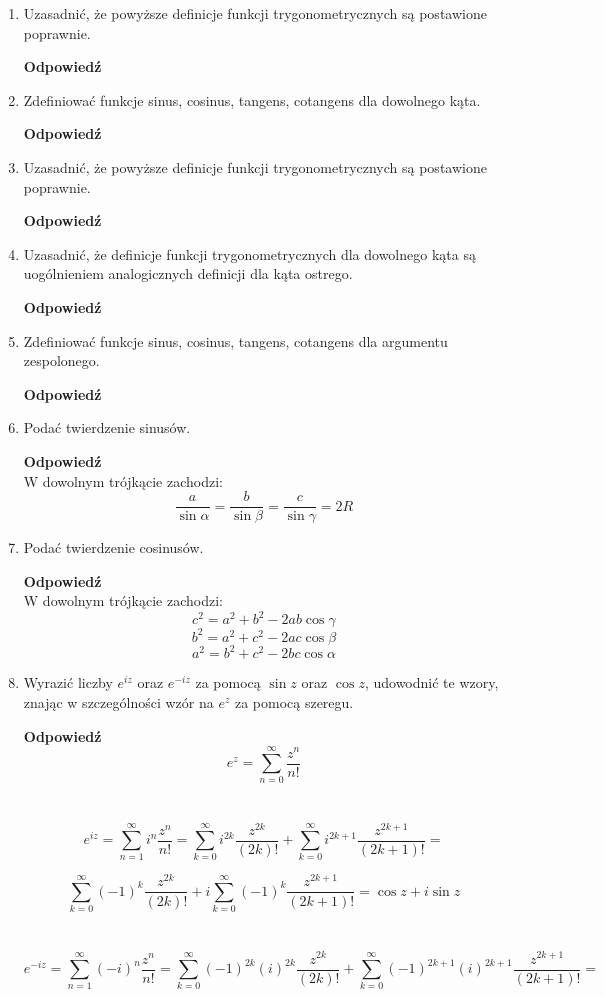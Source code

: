 \documentclass[12pt,a4paper]{article}
\newcounter{twierdzenie}
\theoremstyle{break}
\newcommand{\Odp}[1]{
		\begin{mdframed}[style=zadanie]
			\textbf{Odpowiedź}\\
			#1
		\end{mdframed}
	}
\begin{document}
\begin{enumerate}[1.]
	\item Uzasadnić, że powyższe deﬁnicje funkcji trygonometrycznych są postawione poprawnie.
	\Odp{
		
	}
	
	\item Zdeﬁniować funkcje sinus, cosinus, tangens, cotangens dla dowolnego kąta.
	\Odp{
		
	}
	
	\item Uzasadnić, że powyższe deﬁnicje funkcji trygonometrycznych są postawione poprawnie.
	\Odp{
		
	}
	
	\item Uzasadnić, że deﬁnicje funkcji trygonometrycznych dla dowolnego kąta są uogólnieniem analogicznych deﬁnicji dla kąta ostrego.
	\Odp{
		
	}
	
	\item Zdeﬁniować funkcje sinus, cosinus, tangens, cotangens dla argumentu zespolonego.
	\Odp{
		
	}
	
	\item Podać twierdzenie sinusów.
	\Odp{
		W dowolnym trójkącie zachodzi:
		$$\frac{a}{\sin\alpha}=\frac{b}{\sin\beta}=\frac{c}{\sin\gamma}=2R$$
	}
	
	\item Podać twierdzenie cosinusów.
	\Odp{
		W dowolnym trójkącie zachodzi:
		$$c^2=a^2+b^2-2ab\cos\gamma$$
		$$b^2=a^2+c^2-2ac\cos\beta$$
		$$a^2=b^2+c^2-2bc\cos\alpha$$
	}
	
	\item Wyrazić liczby $e^{iz}$ oraz $e^{-iz}$ za pomocą $\sin z$ oraz $\cos z$, udowodnić te wzory, znając w	szczególności wzór na $e^z$ za pomocą szeregu.
	\Odp{
		$$e^z=\sum_{n=0}^{\infty} \frac{z^n}{n!}$$\\\\
		
		$$e^{iz}=\sum_{n=1}^{\infty} i^n\frac{z^n}{n!}=
		\sum_{k=0}^{\infty}i^{2k}\frac{z^{2k}}{(2k)!}+\sum_{k=0}^{\infty}i^{2k+1}\frac{z^{2k+1}}{(2k+1)!}=$$
		
		 $$
		\sum_{k=0}^{\infty}(-1)^{k}\frac{z^{2k}}{(2k)!}+i\sum_{k=0}^{\infty}(-1)^{k}\frac{z^{2k+1}}{(2k+1)!}=\cos z + i\sin z$$\\\\
		
		$$e^{-iz}=\sum_{n=1}^{\infty} (-i)^n\frac{z^n}{n!}=
		\sum_{k=0}^{\infty}(-1)^{2k}(i)^{2k}\frac{z^{2k}}{(2k)!}+\sum_{k=0}^{\infty}(-1)^{2k+1}(i)^{2k+1}\frac{z^{2k+1}}{(2k+1)!}=$$
		
}
\end{enumerate}
\end{document}
